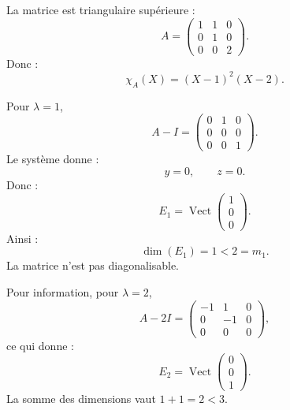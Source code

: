 \documentclass[11pt,a4paper]{article}
\newcommand{\Vect}{\operatorname{Vect}}
\begin{document}
\begin{correctionbox}[5]
La matrice est triangulaire supérieure :
\[
A=
\begin{pmatrix}
1&1&0\\
0&1&0\\
0&0&2
\end{pmatrix}.
\]
Donc :
\[
\chi_A(X)=(X-1)^2(X-2).
\]

Pour \(\lambda=1\),
\[
A-I=
\begin{pmatrix}
0&1&0\\
0&0&0\\
0&0&1
\end{pmatrix}.
\]
Le système donne :
\[
y=0,\qquad z=0.
\]
Donc :
\[
E_1=\Vect
\begin{pmatrix}
1\\0\\0
\end{pmatrix}.
\]
Ainsi :
\[
\dim(E_1)=1<2=m_1.
\]
La matrice n'est pas diagonalisable.

Pour information, pour \(\lambda=2\),
\[
A-2I=
\begin{pmatrix}
-1&1&0\\
0&-1&0\\
0&0&0
\end{pmatrix},
\]
ce qui donne :
\[
E_2=\Vect
\begin{pmatrix}
0\\0\\1
\end{pmatrix}.
\]
La somme des dimensions vaut \(1+1=2<3\).
\end{correctionbox}
\end{document}
